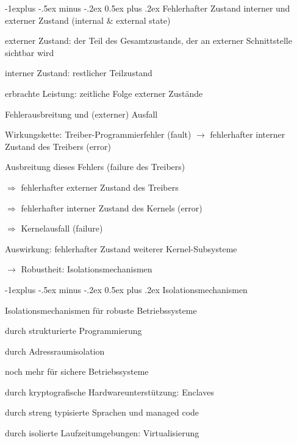 \documentclass[a4paper]{article}
\makeatletter
\renewcommand{\subsection}{\@startsection{subsection}{2}{0mm}%
 {-1explus -.5ex minus -.2ex}%
 {0.5ex plus .2ex}%
 {\normalfont\normalsize\bfseries}}
\makeatother
\begin{document}
\begin{multicols}{3}
    \subsection{Fehlerhafter Zustand}
    interner und externer Zustand (internal \& external state)
    \begin{itemize*}
        \item externer Zustand: der Teil des Gesamtzustands, der an externer Schnittstelle sichtbar wird
        \item interner Zustand: restlicher Teilzustand
        \item erbrachte Leistung: zeitliche Folge externer Zustände
    \end{itemize*}
    Fehlerausbreitung und (externer) Ausfall
    \begin{itemize*}
        \item Wirkungskette: Treiber-Programmierfehler (fault) $\rightarrow$ fehlerhafter interner Zustand des Treibers (error)
        \begin{itemize*}
            \item Ausbreitung dieses Fehlers (failure des Treibers)
            \item[$\Rightarrow$] fehlerhafter externer Zustand des Treibers
            \item[$\Rightarrow$] fehlerhafter interner Zustand des Kernels (error)
            \item[$\Rightarrow$] Kernelausfall (failure)
        \end{itemize*}
        \item Auswirkung: fehlerhafter Zustand weiterer Kernel-Subsysteme
        \item[$\rightarrow$] Robustheit: Isolationsmechanismen
    \end{itemize*}

    \subsection{Isolationsmechanismen}
    \begin{itemize*}
        \item Isolationsmechanismen für robuste Betriebssysteme
        \begin{itemize*}
            \item durch strukturierte Programmierung
            \item durch Adressraumisolation
        \end{itemize*}
        \item noch mehr für sichere Betriebssysteme
        \begin{itemize*}
            \item durch kryptografische Hardwareunterstützung: Enclaves
            \item durch streng typisierte Sprachen und managed code
            \item durch isolierte Laufzeitumgebungen: Virtualisierung
        \end{itemize*}
    \end{itemize*}


\end{multicols}
\end{document}

